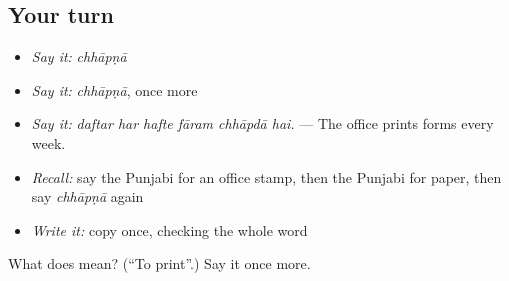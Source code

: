 \subsection*{Your turn}
\begin{itemize}
\raggedright
  \item \emph{Say it:} \emph{chhāpṇā}
  \item \emph{Say it:} \emph{chhāpṇā}, once more
  \item \emph{Say it:} \emph{daftar har hafte fāram chhāpdā hai.} — The office prints forms every week.
  \item \emph{Recall:} say the Punjabi for an office stamp, then the Punjabi for paper, then say \emph{chhāpṇā} again
  \item \emph{Write it:} copy \textbf{} once, checking the whole word
\end{itemize}

\begin{tcolorbox}[breakable,colback=teal!4,colframe=teal!35!black,title={Before you move on}]
What does  mean? (\textquotedblleft{}To print\textquotedblright{}.) Say it once more.
\end{tcolorbox}

